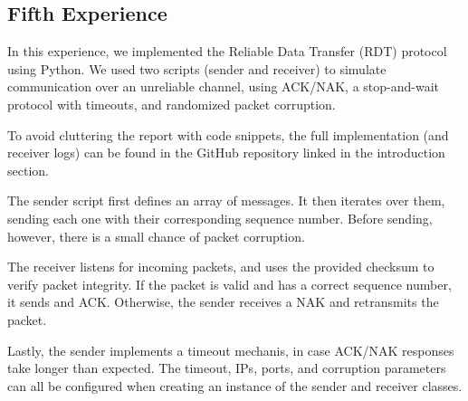\subsection{Fifth Experience}

In this experience, we implemented the Reliable Data Transfer (RDT) protocol
using Python. We used two scripts (sender and receiver) to simulate
communication over an unreliable channel, using ACK/NAK, a stop-and-wait
protocol with timeouts, and randomized packet corruption.

To avoid cluttering the report with code snippets, the full implementation (and
receiver logs) can be found in the GitHub repository linked in the introduction
section.

The sender script first defines an array of messages. It then iterates over
them, sending each one with their corresponding sequence number. Before
sending, however, there is a small chance of packet corruption.

The receiver listens for incoming packets, and uses the provided checksum to
verify packet integrity. If the packet is valid and has a correct sequence
number, it sends and ACK. Otherwise, the sender receives a NAK and retransmits
the packet.

Lastly, the sender implements a timeout mechanis, in case ACK/NAK responses
take longer than expected. The timeout, IPs, ports, and corruption parameters
can all be configured when creating an instance of the sender and receiver
classes.

